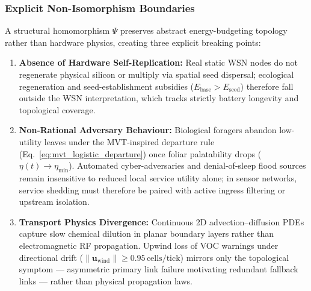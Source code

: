 \subsubsection{Explicit Non-Isomorphism Boundaries}
A structural homomorphism $\Psi$ preserves abstract energy-budgeting topology rather than hardware physics, creating three explicit breaking points:
\begin{enumerate}
  \item \textbf{Absence of Hardware Self-Replication:} Real static WSN nodes do not regenerate physical silicon or multiply via spatial seed dispersal; ecological regeneration and seed-establishment subsidies ($E_{\text{base}} > E_{\text{seed}}$) therefore fall outside the WSN interpretation, which tracks strictly battery longevity and topological coverage.
  \item \textbf{Non-Rational Adversary Behaviour:} Biological foragers abandon low-utility leaves under the MVT-inspired departure rule (Eq.~\eqref{eq:mvt_logistic_departure}) once foliar palatability drops ($\eta(t) \to \eta_{\min}$). Automated cyber-adversaries and denial-of-sleep flood sources remain insensitive to reduced local service utility alone; in sensor networks, service shedding must therefore be paired with active ingress filtering or upstream isolation.
  \item \textbf{Transport Physics Divergence:} Continuous 2D advection--diffusion PDEs capture slow chemical dilution in planar boundary layers rather than electromagnetic RF propagation. Upwind loss of VOC warnings under directional drift ($\|\mathbf{u}_{\text{wind}}\| \ge 0.95\,\text{cells/tick}$) mirrors only the topological symptom --- asymmetric primary link failure motivating redundant fallback links --- rather than physical propagation laws.
\end{enumerate}

